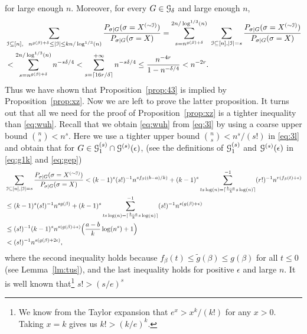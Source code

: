 \documentclass{article}
\begin{document}
for large enough $n$.
 Moreover, for every $G\in\mathcal{G}_\delta$ and large enough $n$,
\begin{align*}
& \sum_{\mathcal{I}\subseteq[n],~~
n^{g(\beta)+\delta}\le |\mathcal{I}|\le kn/\log^{1/3}(n)}
\frac{P_{\sigma|G}(\sigma=X^{(\sim\mathcal{I})})}{P_{\sigma|G}(\sigma=X)} =
\sum_{s=n^{g(\beta)+\delta}}^{2n/\log^{1/3}(n)}
\hspace*{0.05in}
\sum_{\mathcal{I}\subseteq[n],|\mathcal{I}|=s}
\frac{P_{\sigma|G}(\sigma=X^{(\sim \mathcal{I})} )}
{P_{\sigma|G}(\sigma=X)}  \\
& < \sum_{s=n^{g(\beta)+\delta}}^{2n/\log^{1/3}(n)}
n^{-s \delta /4}
< \sum_{s=\lceil 16r/\delta \rceil}^{+\infty}
n^{-s \delta /4}
\le \frac{n^{-4r}}{1-n^{-\delta /4}} < n^{-2r} .
\end{align*}
Thus we have shown that Proposition~\ref{prop:43} is implied by Proposition~\ref{prop:xz}. Now we are left to prove the latter proposition.
It turns out that all we need for the proof of Proposition~\ref{prop:xz} is a tighter inequality than \eqref{eq:wuh}.
Recall that we obtain \eqref{eq:wuh} from \eqref{eq:3l} by using a coarse upper bound $\binom{n}{s}<n^s$.
Here we use a tighter upper bound $\binom{n}{s}<n^s/(s!)$ in \eqref{eq:3l} and obtain that for
$G\in\mathcal{G}_1^{(s)}\cap\mathcal{G}^{(s)}(\epsilon)$,
(see the definitions of $\mathcal{G}_1^{(s)}$ and $\mathcal{G}^{(s)}(\epsilon)$
in \eqref{eq:g1k} and \eqref{eq:gep})
\begin{equation} \label{eq:zm}
\begin{aligned}
& \sum_{\mathcal{I}\subseteq[n],|\mathcal{I}|=s}
\frac{P_{\sigma|G}(\sigma=X^{(\sim \mathcal{I})} )}
{P_{\sigma|G}(\sigma=X)} 
< (k-1)^s(s!)^{-1} n^{sf_{\beta}((b-a)/k)} +
(k-1)^s\sum_{ts\log(n)=\lceil\frac{b-a}{k}s\log(n) \rceil}^{-1}
(r!)^{-1} n^{r(f_{\beta}(t)+\epsilon)} \\
& \le (k-1)^s(s!)^{-1} n^{sg(\beta)}
+ (k-1)^s\sum_{ts\log(n)=\lceil\frac{b-a}{k}s\log(n) \rceil}^{-1}  (s!)^{-1} n^{s(g(\beta) + \epsilon)}  \\
& \le (s!)^{-1} (k-1)^s n^{s(g(\beta) + \epsilon)}
\Big(\frac{a-b}{k}\log(n^s)+1 \Big) \\
& < (s!)^{-1} n^{s(g(\beta) + 2\epsilon)}  ,
\end{aligned}
\end{equation}
where the second inequality holds because
$f_{\beta}(t)\le \tilde{g}(\beta) \le g(\beta)$ for all $t\le 0$
(see  Lemma~\ref{lm:tus}), and the last inequality holds for positive $\epsilon$ and large $n$.
It is well known that\footnote{We know from the Taylor expansion that $e^x>x^k/(k!)$ for any $x>0$. Taking $x=k$ gives us $k!>(k/e)^k$.}
$s!>(s/e)^s$
\end{document}
